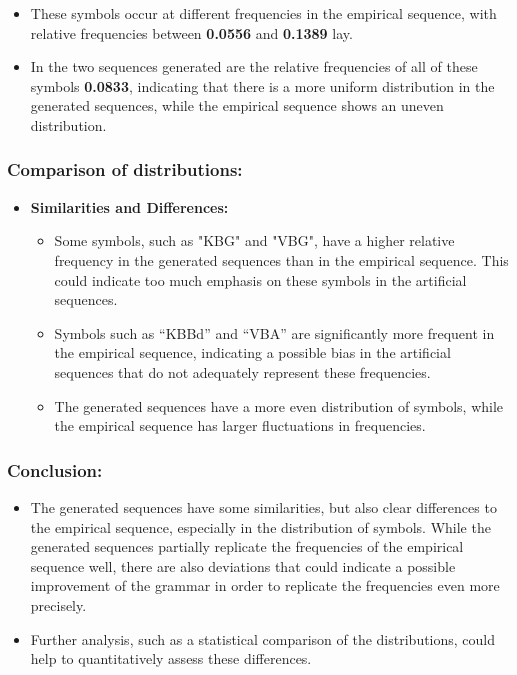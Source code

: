 \documentclass[
]{article}
\begin{document}
\begin{enumerate}
  \begin{itemize}
  \item
    These symbols occur at different frequencies in the empirical
    sequence, with relative frequencies between \textbf{0.0556} and
    \textbf{0.1389} lay.
  \item
    In the two sequences generated are the relative frequencies of all
    of these symbols \textbf{0.0833}, indicating that there is a more
    uniform distribution in the generated sequences, while the empirical
    sequence shows an uneven distribution.
  \end{itemize}
\end{enumerate}

\subsubsection{\texorpdfstring{\textbf{Comparison of
distributions:}}{Comparison of distributions:}}\label{comparison-of-distributions}

\begin{itemize}
\item
  \textbf{Similarities and Differences:}

  \begin{itemize}
  \item
    Some symbols, such as "KBG" and "VBG", have a higher relative
    frequency in the generated sequences than in the empirical sequence.
    This could indicate too much emphasis on these symbols in the
    artificial sequences.
  \item
    Symbols such as ``KBBd'' and ``VBA'' are significantly more frequent
    in the empirical sequence, indicating a possible bias in the
    artificial sequences that do not adequately represent these
    frequencies.
  \item
    The generated sequences have a more even distribution of symbols,
    while the empirical sequence has larger fluctuations in frequencies.
  \end{itemize}
\end{itemize}

\subsubsection{\texorpdfstring{\textbf{Conclusion:}}{Conclusion:}}\label{conclusion}

\begin{itemize}
\item
  The generated sequences have some similarities, but also clear
  differences to the empirical sequence, especially in the distribution
  of symbols. While the generated sequences partially replicate the
  frequencies of the empirical sequence well, there are also deviations
  that could indicate a possible improvement of the grammar in order to
  replicate the frequencies even more precisely.
\item
  Further analysis, such as a statistical comparison of the
  distributions, could help to quantitatively assess these differences.
\end{itemize}
\end{document}
